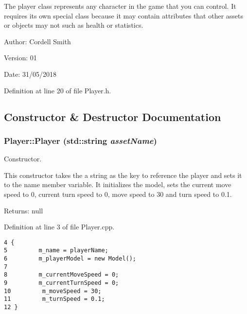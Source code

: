 The player class represents any character in the game that you can control. It requires its own special class because it may contain attributes that other assets or objects may not such as health or statistics.

\begin{Desc}
\item[Author:]Cordell Smith \end{Desc}
\begin{Desc}
\item[Version:]01 \end{Desc}
\begin{Desc}
\item[Date:]31/05/2018 \end{Desc}


Definition at line 20 of file Player.h.

\subsection{Constructor \& Destructor Documentation}
\hypertarget{class_player_1608a9c58abd8e3a681f683672b25601}{
\subsubsection[Player]{\setlength{\rightskip}{0pt plus 5cm}Player::Player (std::string {\em assetName})}}
\label{class_player_1608a9c58abd8e3a681f683672b25601}


Constructor. 

This constructor takes the a string as the key to reference the player and sets it to the name member variable. It initializes the model, sets the current move speed to 0, current turn speed to 0, move speed to 30 and turn speed to 0.1.

\begin{Desc}
\item[Returns:]null \end{Desc}


Definition at line 3 of file Player.cpp.

\begin{Code}\begin{verbatim}4 {
5         m_name = playerName;
6         m_playerModel = new Model();
7 
8         m_currentMoveSpeed = 0;
9         m_currentTurnSpeed = 0;
10         m_moveSpeed = 30;
11         m_turnSpeed = 0.1;
12 }
\end{verbatim}
\end{Code}


